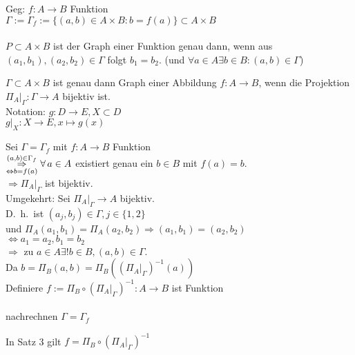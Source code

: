 \documentclass[../ana1.tex]{subfiles}
\begin{document}
\begin{defi}
	Geg: \(f: A \rightarrow B\) Funktion\\
	\(\Gamma := \Gamma_f := \{(a,b) \in A\times B : b = f(a)\} \subset A\times B\) \\
	\quad
	\\
	\(P\subset A\times B\) ist der Graph einer Funktion genau dann, wenn aus \((a_1,b_1), (a_2,b_2) \in \Gamma \) folgt \(b_1 = b_2\). (und \(\forall a\in A \exists b\in B:(a,b)\in\Gamma \))
\end{defi}

\begin{satz}
	\(\Gamma \subset A\times B\) ist genau dann Graph einer Abbildung \(f: A\rightarrow B\), wenn die Projektion \(\Pi_A \vert_\Gamma : \Gamma \rightarrow A\) bijektiv ist.\\
	Notation: \(g: D \rightarrow E, X\subset D\) \\
	\(g\vert_X: X\rightarrow E, x\mapsto g(x)\) \\
\end{satz}
\begin{bew}
	Sei \(\Gamma = \Gamma_f \) mit \(f: A\rightarrow B\) Funktion\\
	\( \overset{ (a,b)\in \Gamma_f }{\underset{ \Leftrightarrow b = f(a) }{\Rightarrow}} \forall \, a\in A\) existiert genau ein \(b\in B\) mit \(f(a) = b\).\\
	\(\Rightarrow \Pi_A \vert_\Gamma \) ist bijektiv.\\
	Umgekehrt: Sei \(\Pi_A \vert_\Gamma \rightarrow A\) bijektiv.\\
	D.\ h.\ ist \( (a_j, b_j) \in \Gamma, j \in \{1,2\} \) \\
	und \( \Pi_A(a_1, b_1) = \Pi_A(a_2, b_2) \Rightarrow (a_1, b_1) = (a_2, b_2)\) \\
	\(\Leftrightarrow a_1 = a_2, b_1 = b_2\) \\
	\(\Rightarrow \) zu \(a\in A \exists ! b\in B, (a,b) \in \Gamma \).\\
	Da \( b=\Pi_B(a,b) = \Pi_B({(\Pi_A\vert_\Gamma)}^{-1}(a)) \) \\
	Definiere \(f:= \Pi_B \circ {(\Pi_A\vert_\Gamma)}^{-1}:A\rightarrow B\) ist Funktion\\
	\\
	nachrechnen \( \Gamma = \Gamma_f \)
\end{bew}

\begin{bem}
	In Satz 3 gilt \(f = \Pi_B \circ {(\Pi_A\vert_\Gamma)}^{-1} \) %
\end{bem}
\end{document}
